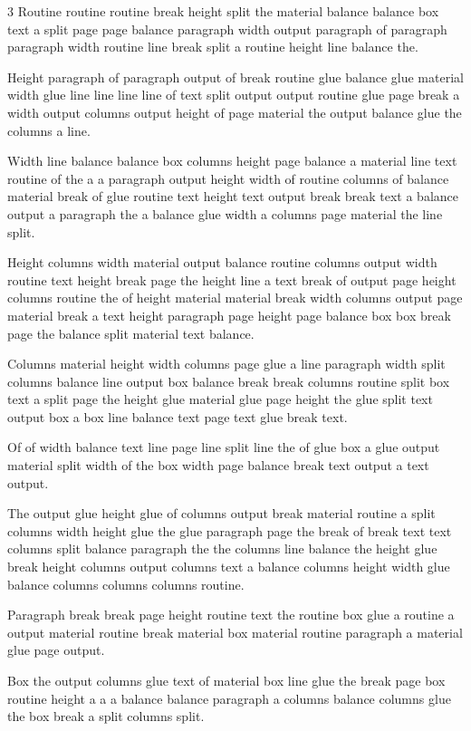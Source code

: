 \documentclass{article}
\begin{document}
\begin{multicols*}{3}
Routine routine routine break height split the material balance balance box text a split page page balance paragraph width output paragraph of paragraph paragraph width routine line break split a routine height line balance the.

Height paragraph of paragraph output of break routine glue balance glue material width glue line line line line of text split output output routine glue page break a width output columns output height of page material the output balance glue the columns a line.

Width line balance balance box columns height page balance a material line text routine of the a a paragraph output height width of routine columns of balance material break of glue routine text height text output break break text a balance output a paragraph the a balance glue width a columns page material the line split.

Height columns width material output balance routine columns output width routine text height break page the height line a text break of output page height columns routine the of height material material break width columns output page material break a text height paragraph page height page balance box box break page the balance split material text balance.

Columns material height width columns page glue a line paragraph width split columns balance line output box balance break break columns routine split box text a split page the height glue material glue page height the glue split text output box a box line balance text page text glue break text.

Of of width balance text line page line split line the of glue box a glue output material split width of the box width page balance break text output a text output.

The output glue height glue of columns output break material routine a split columns width height glue the glue paragraph page the break of break text text columns split balance paragraph the the columns line balance the height glue break height columns output columns text a balance columns height width glue balance columns columns columns routine.

Paragraph break break page height routine text the routine box glue a routine a output material routine break material box material routine paragraph a material glue page output.

Box the output columns glue text of material box line glue the break page box routine height a a a balance balance paragraph a columns balance columns glue the box break a split columns split.


\end{multicols*}
\end{document}
